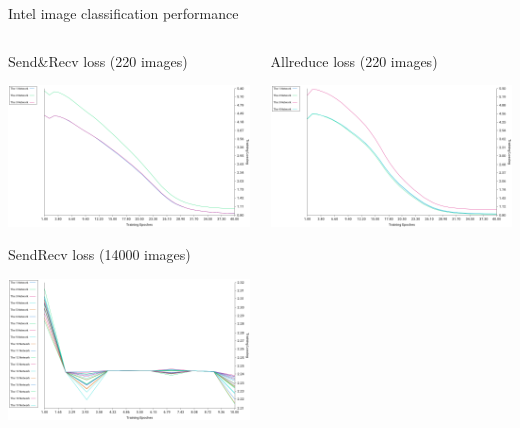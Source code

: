 \documentclass[presentation]{beamer}
\begin{document}
\begin{frame}[label={sec:orgfb39063}]{Intel image classification performance}
\begin{columns}
\begin{column}{0.55\columnwidth}
\begin{block}{Send\&Recv loss (220 images)}
\begin{center}
\includegraphics[width=.9\linewidth]{./png/intelImage_subset_sendrecving_loss.png}
\end{center}
 SendRecv loss (14000 images)
\begin{center}
\includegraphics[width=.9\linewidth]{./png/intelImage_sendrecv_loss.png}
\end{center}
\end{block}
\end{column}
\begin{column}{0.55\columnwidth}
\begin{block}{Allreduce loss (220 images)}
\begin{center}
\includegraphics[width=.9\linewidth]{./png/intelImage_subset_allreduce_loss.png}

\end{center}
\end{block}
\end{column}
\end{columns}
\end{frame}
\end{document}
